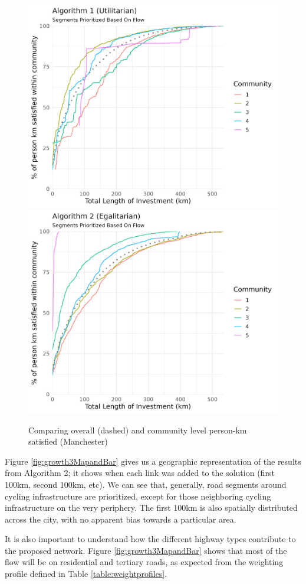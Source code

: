 \documentclass[
]{article}
\begin{document}
\begin{figure}

{\centering \includegraphics[width=0.48\linewidth]{data/Manchester/Plots/Growth_Results/growth_utilitarian_satisfied_km_both_flow_column} \includegraphics[width=0.48\linewidth]{data/Manchester/Plots/Growth_Results/growth_egalitarian_satisfied_km_both_flow_column} 

}

\caption{Comparing overall (dashed) and community level person-km satisfied (Manchester)}\label{fig:growthtotal}
\end{figure}

Figure \ref{fig:growth3MapandBar} gives us a geographic representation
of the results from Algorithm 2; it shows when each link was added to
the solution (first 100km, second 100km, etc). We can see that,
generally, road segments around cycling infrastructure are prioritized,
except for those neighboring cycling infrastructure on the very
periphery. The first 100km is also spatially distributed across the
city, with no apparent bias towards a particular area.

It is also important to understand how the different highway types
contribute to the proposed network. Figure \ref{fig:growth3MapandBar}
shows that most of the flow will be on residential and tertiary roads,
as expected from the weighting profile defined in Table
\ref{table:weightprofiles}.
\end{document}
